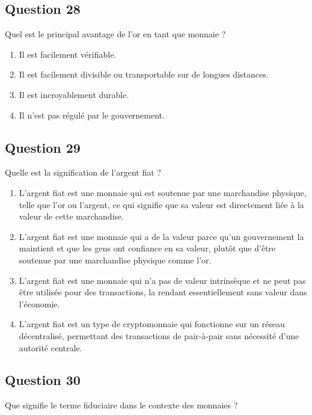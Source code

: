 \documentclass[12pt,a4paper]{article}
\begin{document}
\bigskip


\subsection*{Question 28}
Quel est le principal avantage de l'or en tant que monnaie ?

\begin{enumerate}[label=\Alph*., leftmargin=*]
\item Il est facilement vérifiable.
\item Il est facilement divisible ou transportable sur de longues distances.
\item Il est incroyablement durable.
\item Il n'est pas régulé par le gouvernement.
\end{enumerate}

\bigskip


\subsection*{Question 29}
Quelle est la signification de l'argent fiat ?

\begin{enumerate}[label=\Alph*., leftmargin=*]
\item L'argent fiat est une monnaie qui est soutenue par une marchandise physique, telle que l'or ou l'argent, ce qui signifie que sa valeur est directement liée à la valeur de cette marchandise.
\item L'argent fiat est une monnaie qui a de la valeur parce qu'un gouvernement la maintient et que les gens ont confiance en sa valeur, plutôt que d'être soutenue par une marchandise physique comme l'or.
\item L'argent fiat est une monnaie qui n'a pas de valeur intrinsèque et ne peut pas être utilisée pour des transactions, la rendant essentiellement sans valeur dans l'économie.
\item L'argent fiat est un type de cryptomonnaie qui fonctionne sur un réseau décentralisé, permettant des transactions de pair-à-pair sans nécessité d'une autorité centrale.
\end{enumerate}

\bigskip


\subsection*{Question 30}
Que signifie le terme fiduciaire dans le contexte des monnaies ?
\end{document}
